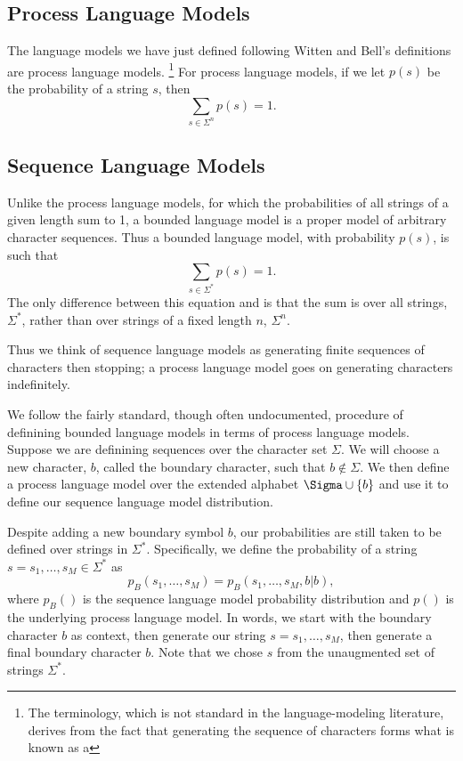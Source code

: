 \subsection{Process Language Models}

The language models we have just defined following Witten and
Bell's definitions are process language models.%
%
\footnote{The terminology, which is not standard in the
  language-modeling literature, derives from the fact that generating
  the sequence of characters forms what is known as a }
%
For process language models, if we let $p(s)$ be the probability of a
string $s$, then
%
\begin{equation}
\sum_{s \in \Sigma^n} p(s) = 1.\label{eq:char-lm-process-norm}
\end{equation}
%


\subsection{Sequence Language Models}

Unlike the process language models, for which the probabilities of all
strings of a given length sum to 1, a bounded language model is a
proper model of arbitrary character sequences.  Thus a bounded
language model, with probability $p(s)$, is such that
%
\begin{equation}
\sum_{s \in \Sigma^*} p(s) = 1.\label{eq:char-lm-seq-norm}
\end{equation}
%
The only difference between this equation and 
is that the sum is over all strings, $\Sigma^*$, rather than over
strings of a fixed length $n$, $\Sigma^n$.

Thus we think of sequence language models as generating finite
sequences of characters then stopping; a process language model
goes on generating characters indefinitely.

We follow the fairly standard, though often undocumented, procedure of
definining bounded language models in terms of process language
models.  Suppose we are definining sequences over the character set
$\Sigma$.  We will choose a new character, $b$, called the boundary
character, such that $b \not\in \Sigma$.  We then define a process
language model over the extended alphabet $\Sigma \cup \setext{b}$ and
use it to define our sequence language model distribution.

Despite adding a new boundary symbol $b$, our probabilities are still
taken to be defined over strings in $\Sigma^*$.  Specifically, we
define the probability of a string $s = s_1,\ldots,s_M \in \Sigma^*$
as
%
\begin{equation}
p_B(s_1,\ldots,s_M) = p_B(s_1,\ldots,s_M,b|b),\label{eq:char-lm-seq-def}
\end{equation}
%
where $p_B()$ is the sequence language model probability distribution
and $p()$ is the underlying process language model.  In words, we
start with the boundary character $b$ as context, then generate our
string $s = s_1,\ldots,s_M$, then generate a final boundary character
$b$.  Note that we chose $s$ from the unaugmented set of strings
$\Sigma^*$.

